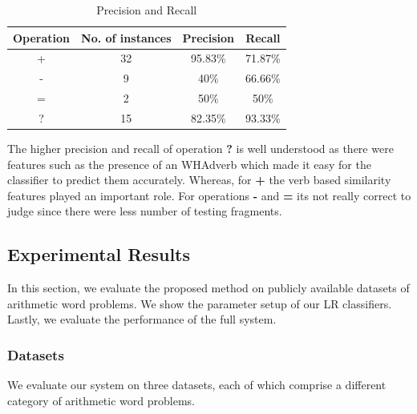 \documentclass[11pt]{article}
\begin{document}
\newpage
\begin{table}[h]
\begin{center}
\begin{tabular}{|c|c|c|c|}
\hline
\bf Operation & \bf No. of instances & \bf Precision & \bf Recall \\
\hline
+ & 32 & 95.83\% & 71.87\% \\
\hline
- & 9 & 40\% & 66.66\% \\
\hline
= & 2 & 50\% & 50\% \\
\hline
? & 15 & 82.35\% & 93.33\% \\
\hline
\end{tabular}
\end{center}
\caption{Precision and Recall}
\label{figure:22}
\end{table}

The higher precision and recall of operation \textbf{?} is well understood as there were features such as the presence of an WHAdverb which made it easy for the classifier to predict them accurately. Whereas, for \textbf{+} the verb based similarity features played an important role. For operations \textbf{-} and \textbf{=} its not really correct to judge since there were less number of testing fragments.

\subsection{Experimental Results}\label{sec:experimentalresults}
In this section, we evaluate the proposed method on publicly available datasets of arithmetic word problems. We show the parameter setup of our LR classifiers. Lastly, we evaluate the performance of the full system.

\subsubsection{Datasets}\label{sec:datasets}
We evaluate our system on three datasets, each of which comprise a different category of arithmetic word problems.
\end{document}
